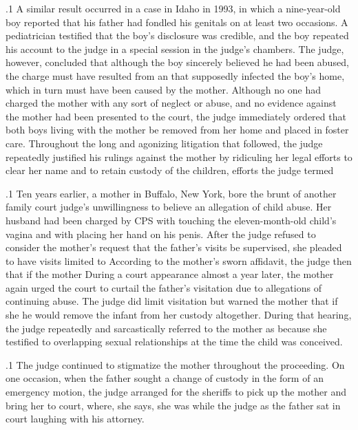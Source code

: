 \documentclass[11pt, twoside]{article}
\begin{document}
{\p.1{%
A similar result occurred in a case in Idaho in 1993, in
which a nine-year-old boy reported that his father had fondled his genitals on at least
two occasions. A pediatrician testified that the boy’s disclosure was credible, and the boy repeated his account to the judge in a special session
in the judge’s chambers. The judge, however, concluded that although
the boy sincerely believed he had been abused, the charge must have resulted from an  that supposedly infected the boy’s
home, which in turn must have been caused by the mother. Although
no one had charged the mother with any sort of neglect or abuse, and no
evidence against the mother had been presented to the court, the judge
immediately ordered that both boys living with the mother be removed
from her home and placed in foster care. Throughout the long and agonizing litigation that followed, the judge repeatedly justified his rulings
against the mother by ridiculing her legal efforts to clear her name and
to retain custody of the children, efforts the judge termed 
}%

\p.1{%
Ten years earlier, a mother in Buffalo, New York, bore the brunt of another family court judge’s unwillingness to believe an allegation of child
abuse. Her husband had been charged by CPS with
touching the eleven-month-old child’s vagina and
with placing her hand on his penis. After
the judge refused to consider the mother’s request that the father’s visits
be supervised, she pleaded to have visits limited to  According to the mother’s sworn affidavit, the judge then  that if the mother 
During a court appearance almost a year later, the mother again
urged the court to curtail the father’s visitation due to allegations
of continuing abuse. The judge did limit visitation but warned the
mother that if she  he would remove the infant from
her custody altogether. During that hearing, the judge repeatedly and
sarcastically referred to the mother as  because she
testified to overlapping sexual relationships at the time the child was
conceived.
}%

\p.1{%
The judge continued to stigmatize the mother throughout the proceeding. On one occasion, when the father sought a change of custody
in the form of an emergency motion, the judge arranged for the sheriffs
to pick up the mother and bring her to court, where, she says, she was
 while the judge  as the father
sat in court laughing with his attorney.
}%

}
\end{document}
